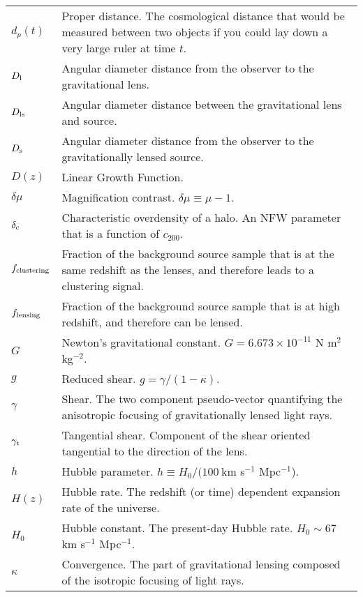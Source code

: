 \section*{\underline{}}
\vspace{-0.5cm}
\begin{tabular}{p{0.6in}p{5.8in}}

$d_p(t)$ & Proper distance. The cosmological distance that would be measured between two objects if you could lay down a very large ruler at time $t$. \\
$D_{\rm l}$ & Angular diameter distance from the observer to the gravitational lens. \\
$D_{\rm ls}$ & Angular diameter distance between the gravitational lens and source. \\
$D_{\rm s}$ & Angular diameter distance from the observer to the gravitationally lensed source. \\
$D(z)$ & Linear Growth Function. \\
$\delta\mu$ & Magnification contrast. $\delta\mu \equiv \mu -1$. \\
$\delta_{\rm c}$ & Characteristic overdensity of a halo. An \acs{NFW} parameter that is a function of $c_{200}$. \\
$f_{\rm clustering}$ & Fraction of the background source sample that is at the same redshift as the lenses, and therefore leads to a clustering signal. \\
$f_{\rm lensing}$ & Fraction of the background source sample that is at high redshift, and therefore can be lensed. \\
$G$ & Newton's gravitational constant. $G = 6.673 \times 10^{-11}$ N m$^2$ kg$^{-2}$.\\
$g$ & Reduced shear. $g = \gamma/(1-\kappa)$. \\
$\gamma$ & Shear. The two component pseudo-vector quantifying the anisotropic focusing of gravitationally lensed light rays. \\
$\gamma_{\rm t}$ & Tangential shear. Component of the shear oriented tangential to the direction of the lens. \\
$h$ & Hubble parameter. $h \equiv H_0/(100\ $km s$^{-1}$ Mpc$^{-1}$). \\
$H(z)$ & Hubble rate. The redshift (or time) dependent expansion rate of the universe. \\
$H_0$ & Hubble constant. The present-day Hubble rate. $H_0 \sim 67$ km s$^{-1}$ Mpc$^{-1}$. \\
$\kappa$ & Convergence. The part of gravitational lensing composed of the isotropic focusing of light rays. \\

\end{tabular}
